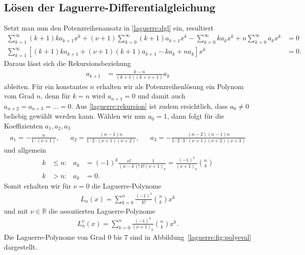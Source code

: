 \subsection{Lösen der Laguerre-Differentialgleichung}
Setzt man nun den Potenzreihenansatz in 
\eqref{laguerre:dgl}
ein,
resultiert
\begin{align*}
\sum_{k=1}^\infty (k+1) k a_{k+1} x^k
+
(\nu + 1)\sum_{k=0}^\infty (k+1) a_{k+1} x^k
-
\sum_{k=0}^\infty k a_k x^k
+
n \sum_{k=0}^\infty a_k x^k
 & =
0    \\
\sum_{k=1}^\infty
\left[ (k+1) k a_{k+1} + (\nu + 1)(k+1) a_{k+1} - k a_k + n a_k \right] x^k
 & =
0.
\end{align*}
Daraus lässt sich die Rekursionsbeziehung
\begin{align}
a_{k+1}
 & =
\frac{k-n}{(k+1) (k + \nu + 1)} a_k
\label{laguerre:rekursion}
\end{align}
ableiten.
Für ein konstantes $n$ erhalten wir als Potenzreihenlösung ein Polynom vom Grad
$n$,
denn für $k=n$ wird $a_{n+1} = 0$ und damit auch $a_{n+2}=a_{n+3}=\ldots=0$.
Aus %
\eqref{laguerre:rekursion} ist zudem ersichtlich,
dass $a_0 \neq 0$ beliebig gewählt werden kann.
Wählen wir nun $a_0 = 1$, dann folgt für die Koeffizienten $a_1, a_2, a_3$
\begin{align*}
a_1
=
-\frac{n}{1 \cdot (\nu + 1)}
, &  &
a_2
=
\frac{(n-1)n}{1 \cdot 2 \cdot (\nu + 1)(\nu + 2)}
, &  &
a_3
=
-\frac{(n-2)(n-1)n}{1 \cdot 2 \cdot 3 \cdot (\nu + 1)(\nu + 2)(\nu + 3)}
\end{align*}
und allgemein
\begin{align*}
k
  & \leq
n:
  &
a_k
  & =
(-1)^k \frac{n!}{(n-k)!} \frac{1}{k!(\nu + 1)_k}
=
\frac{(-1)^k}{(\nu + 1)_k} \binom{n}{k}
\\
k & >n:
  &
a_k
  & =
0.
\end{align*}
Somit erhalten wir für $\nu = 0$ die Laguerre-Polynome
\begin{align}
L_n(x)
=
\sum_{k=0}^{n} \frac{(-1)^k}{k!} \binom{n}{k} x^k
\label{laguerre:polynom}
\end{align}
und mit $\nu \in \mathbb{R}$ die assoziierten Laguerre-Polynome
\begin{align}
L_n^\nu(x)
=
\sum_{k=0}^{n} \frac{(-1)^k}{(\nu + 1)_k} \binom{n}{k} x^k.
\label{laguerre:allg_polynom}
\end{align}
Die Laguerre-Polynome von Grad $0$ bis $7$ sind in
Abbildung~\ref{laguerre:fig:polyeval} dargestellt.
